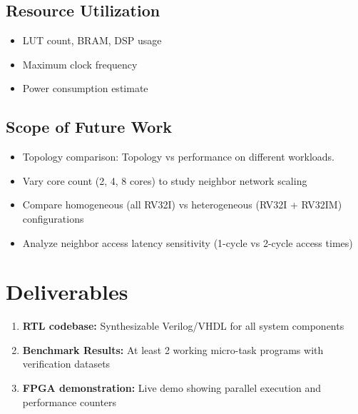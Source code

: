 \documentclass[a4paper,12pt]{article}
\begin{document}
\subsection*{Resource Utilization}
\begin{itemize}
    \item LUT count, BRAM, DSP usage
    \item Maximum clock frequency
    \item Power consumption estimate
\end{itemize}

\subsection*{Scope of Future Work}
\begin{itemize}
    \item Topology comparison: Topology vs performance on different workloads.
    \item Vary core count (2, 4, 8 cores) to study neighbor network scaling
    \item Compare homogeneous (all RV32I) vs heterogeneous (RV32I + RV32IM) configurations
    \item Analyze neighbor access latency sensitivity (1-cycle vs 2-cycle access times)
\end{itemize}

\section*{Deliverables}

\begin{enumerate}[leftmargin=*]
    \item \textbf{RTL codebase:} Synthesizable Verilog/VHDL for all system components
    \item \textbf{Benchmark Results:} At least 2 working micro-task programs with verification datasets
    \item \textbf{FPGA demonstration:} Live demo showing parallel execution and performance counters
\end{enumerate}
\end{document}
